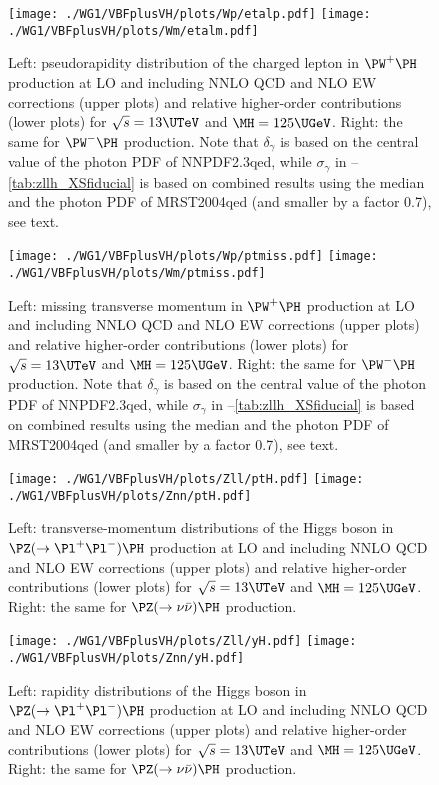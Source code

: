 \begin{figure}
\texttt{[image: ./WG1/VBFplusVH/plots/Wp/etalp.pdf]}
\hfill
\texttt{[image: ./WG1/VBFplusVH/plots/Wm/etalm.pdf]}
\caption{Left: pseudorapidity distribution of the charged lepton in $\PW^+\PH$
production at LO and including NNLO QCD and NLO EW corrections (upper plots)
and relative higher-order contributions (lower plots) for $\sqrt{s}=13\UTeV$ and $\MH=125\UGeV$.
Right: the same for $\PW^-\PH$ production.
Note that $\delta_\gamma$ is based on the central value
of the photon PDF of NNPDF2.3qed, while $\sigma_\gamma$ in --\ref{tab:zllh_XSfiducial}
is based on combined results using the median and the photon PDF of MRST2004qed (and smaller by a factor 0.7), see text. 
}
\label{fig:SM-WH-ptlep}
\end{figure}
%
\begin{figure}
\texttt{[image: ./WG1/VBFplusVH/plots/Wp/ptmiss.pdf]}
\hfill
\texttt{[image: ./WG1/VBFplusVH/plots/Wm/ptmiss.pdf]}
\caption{Left: missing transverse momentum in $\PW^+\PH$
production at LO and including NNLO QCD and NLO EW corrections (upper plots)
and relative higher-order contributions (lower plots) for $\sqrt{s}=13\UTeV$ and $\MH=125\UGeV$.
Right: the same for $\PW^-\PH$ production.
Note that $\delta_\gamma$ is based on the central value
of the photon PDF of NNPDF2.3qed, while $\sigma_\gamma$ in --\ref{tab:zllh_XSfiducial}
is based on combined results using the median and the photon PDF of MRST2004qed (and smaller by a factor 0.7), see text. 
}
\label{fig:SM-WH-ptmiss}
\end{figure}
%
\begin{figure}
\texttt{[image: ./WG1/VBFplusVH/plots/Zll/ptH.pdf]}
\hfill
\texttt{[image: ./WG1/VBFplusVH/plots/Znn/ptH.pdf]}
\caption{Left: transverse-momentum distributions of the Higgs boson in $\PZ(\rightarrow \Pl^+\Pl^-)\PH$
production at LO and including NNLO QCD and NLO EW corrections (upper plots)
and relative higher-order contributions (lower plots) for $\sqrt{s}=13\UTeV$ and $\MH=125\UGeV$.
Right: the same for $\PZ(\rightarrow \nu \bar\nu)\PH$ production.}
\label{fig:SM-ZH-ptH}
\end{figure}
%
\begin{figure}
\texttt{[image: ./WG1/VBFplusVH/plots/Zll/yH.pdf]}
\hfill
\texttt{[image: ./WG1/VBFplusVH/plots/Znn/yH.pdf]}
\caption{Left: rapidity distributions of the Higgs boson in $\PZ(\rightarrow \Pl^+\Pl^-)\PH$
production at LO and including NNLO QCD and NLO EW corrections (upper plots)
and relative higher-order contributions (lower plots) for $\sqrt{s}=13\UTeV$ and $\MH=125\UGeV$.
Right: the same for $\PZ(\rightarrow \nu \bar\nu)\PH$ production.}
\label{fig:SM-ZH-yH}
\end{figure}
